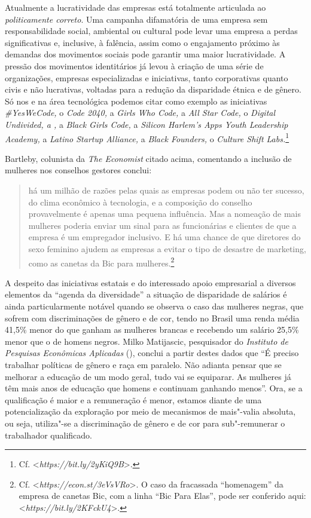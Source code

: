 Atualmente a lucratividade das empresas está totalmente articulada ao
\emph{politicamente correto}. Uma campanha difamatória de uma empresa
sem responsabilidade social, ambiental ou cultural pode levar uma
empresa a perdas significativas e, inclusive, à falência, assim como o
engajamento próximo às demandas dos movimentos sociais pode garantir uma
maior lucratividade. A pressão dos movimentos identitários já levou à
criação de uma série de organizações, empresas especializadas e
iniciativas, tanto corporativas quanto civis e não lucrativas, voltadas
para a redução da disparidade étnica e de gênero. Só nos  e na área
tecnológica podemos citar como exemplo as iniciativas
\emph{\#YesWeCode,} o \emph{Code 2040,} a \emph{Girls Who Code,} a
\emph{All Star Code,} o \emph{Digital Undivided, a ,} a
\emph{Black Girls Code,} a \emph{Silicon Harlem's Apps Youth Leadership
Academy,} a \emph{Latino Startup Alliance,} a \emph{Black Founders,} o
\emph{Culture Shift Labs.}\footnote{Cf.
  \textless{}\emph{https://bit.ly/2yKiQ9B}\textgreater{}.}

Bartleby, colunista da \emph{The Economist} citado acima, comentando a
inclusão de mulheres nos conselhos gestores conclui:

\begin{quote}
há um milhão de razões pelas quais as empresas podem ou não ter sucesso,
do clima econômico à tecnologia, e a composição do conselho
provavelmente é apenas uma pequena influência. Mas a nomeação de mais
mulheres poderia enviar um sinal para as funcionárias e clientes de que
a empresa é um empregador inclusivo. E há uma chance de que diretores do
sexo feminino ajudem as empresas a evitar o tipo de desastre de
marketing, como as canetas da Bic para mulheres.\footnote{Cf.
  \textless{}\emph{https://econ.st/3eVsVRo}\textgreater{}.
  O caso da fracassada ``homenagem'' da empresa de canetas Bic, com a
  linha ``Bic Para Elas'', pode ser conferido aqui:
  \textless{}\emph{https://bit.ly/2KFckU4}\textgreater{}.}
\end{quote}

A despeito das iniciativas estatais e do interessado apoio empresarial a
diversos elementos da ``agenda da diversidade'' a situação de
disparidade de salários é ainda particularmente notável quando se
observa o caso das mulheres negras, que sofrem com discriminações de
gênero e de cor, tendo no Brasil uma renda média 41,5\% menor do que
ganham as mulheres brancas e recebendo um salário 25,5\% menor que o de
homens negros. Milko Matijascic, pesquisador do \emph{Instituto de
Pesquisas Econômicas Aplicadas} (), conclui a partir destes dados
que ``É preciso trabalhar políticas de gênero e raça em paralelo. Não
adianta pensar que se melhorar a educação de um modo geral, tudo vai se
equiparar. As mulheres já têm mais anos de educação que homens e
continuam ganhando menos''. Ora, se a qualificação é maior e a
remuneração é menor, estamos diante de uma potencialização da exploração
por meio de mecanismos de mais"-valia absoluta, ou seja, utiliza"-se a
discriminação de gênero e de cor para sub"-remunerar o trabalhador
qualificado.

